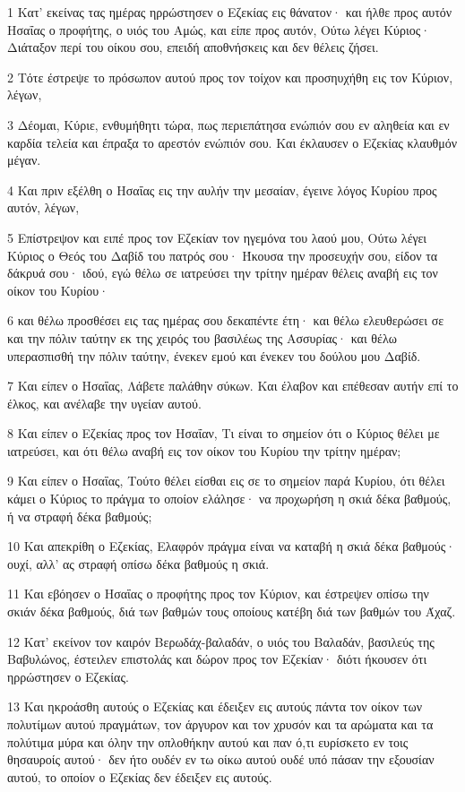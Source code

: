 \par 1 Κατ' εκείνας τας ημέρας ηρρώστησεν ο Εζεκίας εις θάνατον· και ήλθε προς αυτόν Ησαΐας ο προφήτης, ο υιός του Αμώς, και είπε προς αυτόν, Ούτω λέγει Κύριος· Διάταξον περί του οίκου σου, επειδή αποθνήσκεις και δεν θέλεις ζήσει.
\par 2 Τότε έστρεψε το πρόσωπον αυτού προς τον τοίχον και προσηυχήθη εις τον Κύριον, λέγων,
\par 3 Δέομαι, Κύριε, ενθυμήθητι τώρα, πως περιεπάτησα ενώπιόν σου εν αληθεία και εν καρδία τελεία και έπραξα το αρεστόν ενώπιόν σου. Και έκλαυσεν ο Εζεκίας κλαυθμόν μέγαν.
\par 4 Και πριν εξέλθη ο Ησαΐας εις την αυλήν την μεσαίαν, έγεινε λόγος Κυρίου προς αυτόν, λέγων,
\par 5 Επίστρεψον και ειπέ προς τον Εζεκίαν τον ηγεμόνα του λαού μου, Ούτω λέγει Κύριος ο Θεός του Δαβίδ του πατρός σου· Ήκουσα την προσευχήν σου, είδον τα δάκρυά σου· ιδού, εγώ θέλω σε ιατρεύσει την τρίτην ημέραν θέλεις αναβή εις τον οίκον του Κυρίου·
\par 6 και θέλω προσθέσει εις τας ημέρας σου δεκαπέντε έτη· και θέλω ελευθερώσει σε και την πόλιν ταύτην εκ της χειρός του βασιλέως της Ασσυρίας· και θέλω υπερασπισθή την πόλιν ταύτην, ένεκεν εμού και ένεκεν του δούλου μου Δαβίδ.
\par 7 Και είπεν ο Ησαΐας, Λάβετε παλάθην σύκων. Και έλαβον και επέθεσαν αυτήν επί το έλκος, και ανέλαβε την υγείαν αυτού.
\par 8 Και είπεν ο Εζεκίας προς τον Ησαΐαν, Τι είναι το σημείον ότι ο Κύριος θέλει με ιατρεύσει, και ότι θέλω αναβή εις τον οίκον του Κυρίου την τρίτην ημέραν;
\par 9 Και είπεν ο Ησαΐας, Τούτο θέλει είσθαι εις σε το σημείον παρά Κυρίου, ότι θέλει κάμει ο Κύριος το πράγμα το οποίον ελάλησε· να προχωρήση η σκιά δέκα βαθμούς, ή να στραφή δέκα βαθμούς;
\par 10 Και απεκρίθη ο Εζεκίας, Ελαφρόν πράγμα είναι να καταβή η σκιά δέκα βαθμούς· ουχί, αλλ' ας στραφή οπίσω δέκα βαθμούς η σκιά.
\par 11 Και εβόησεν ο Ησαΐας ο προφήτης προς τον Κύριον, και έστρεψεν οπίσω την σκιάν δέκα βαθμούς, διά των βαθμών τους οποίους κατέβη διά των βαθμών του Άχαζ.
\par 12 Κατ' εκείνον τον καιρόν Βερωδάχ-βαλαδάν, ο υιός του Βαλαδάν, βασιλεύς της Βαβυλώνος, έστειλεν επιστολάς και δώρον προς τον Εζεκίαν· διότι ήκουσεν ότι ηρρώστησεν ο Εζεκίας.
\par 13 Και ηκροάσθη αυτούς ο Εζεκίας και έδειξεν εις αυτούς πάντα τον οίκον των πολυτίμων αυτού πραγμάτων, τον άργυρον και τον χρυσόν και τα αρώματα και τα πολύτιμα μύρα και όλην την οπλοθήκην αυτού και παν ό,τι ευρίσκετο εν τοις θησαυροίς αυτού· δεν ήτο ουδέν εν τω οίκω αυτού ουδέ υπό πάσαν την εξουσίαν αυτού, το οποίον ο Εζεκίας δεν έδειξεν εις αυτούς.
